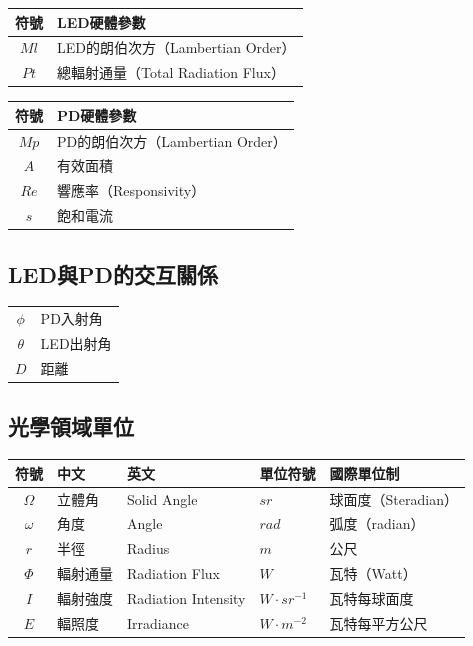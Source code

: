 \begin{longtable}[l]{cl}
    符號 & LED硬體參數\\ \hline
    $Ml$ & LED的朗伯次方（Lambertian Order）\\
    $Pt$ & 總輻射通量（Total Radiation Flux） 
\end{longtable}

\begin{longtable}[l]{cl}
    符號 & PD硬體參數\\ \hline
    $Mp$ & PD的朗伯次方（Lambertian Order）\\
    $A$ & 有效面積\\
    $Re$ & 響應率（Responsivity）\\
    $s$ &飽和電流
\end{longtable}


\onehalfspacing

\subsection*{LED與PD的交互關係}

\begin{longtable}[l]{cl}
    $\phi$ & PD入射角\\
    $\theta$ & LED出射角\\
    $D$&距離\\
\end{longtable}

\onehalfspacing

\subsection*{光學領域單位}

\begin{longtable}[l]{cllll}
    符號& 中文& 英文 & 單位符號&國際單位制\\\hline
    $\Omega$ & 立體角&Solid Angle& $sr$&球面度（Steradian） \\
    $\omega$ & 角度&Angle& $rad$&弧度（radian）\\
    $r$ & 半徑&Radius&  $m$ &公尺\\
    $\Phi$ & 輻射通量&Radiation Flux& $W$&瓦特（Watt）\\
    $I$ & 輻射強度&Radiation Intensity & $W\cdot sr^{-1}$&瓦特每球面度 \\
    $E$ & 輻照度&Irradiance&$W\cdot m^{-2}$ &瓦特每平方公尺\\
\end{longtable}




